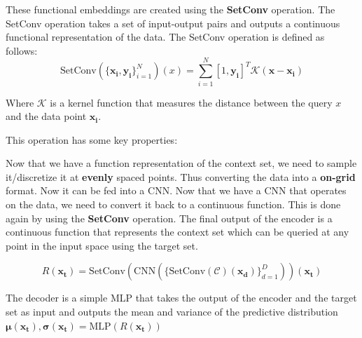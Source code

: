 \documentclass[../../main.tex]{subfiles}
\begin{document}
These functional embeddings are created using the \textbf{SetConv} operation. The SetConv operation takes a set of input-output pairs and outputs a continuous functional representation of the data. The SetConv operation is defined as follows:
\begin{equation}
	\text{SetConv}(\{\bm{x_i}, \bm{y_i}\}_{i=1}^{N})(x) = \sum_{i=1}^{N} [1, \bm{y_i}] ^ T \mathcal{K}(\bm{x} - \bm{x_i})
\end{equation}

Where $\mathcal{K}$ is a kernel function that measures the distance between the query $x$ and the data point $\bm{x_i}$.

This operation has some key properties:


Now that we have a function representation of the context set, we need to sample it/discretize it at \textbf{evenly} spaced points. Thus converting the data into a \textbf{on-grid} format. Now it can be fed into a CNN. Now that we have a CNN that operates on the data, we need to convert it back to a continuous function. This is done again by using the \textbf{SetConv} operation. The final output of the encoder is a continuous function that represents the context set which can be queried at any point in the input space using the target set.

\begin{equation}
	R(\bm{x_t}) = \text{SetConv}(\text{CNN}(\{\text{SetConv}(\mathcal{C})(\bm{x_d})\}_{d=1}^{D}))(\bm{x_t})
\end{equation}



The decoder is a simple MLP that takes the output of the encoder and the target set as input and outputs the mean and variance of the predictive distribution $\bm{\mu}(\bm{x_t}), \bm{\sigma}(\bm{x_t}) = \text{MLP}(R(\bm{x_t}))$


\ifSubfilesClassLoaded{%
    \printbibliography{}
}{} 
\end{document}
